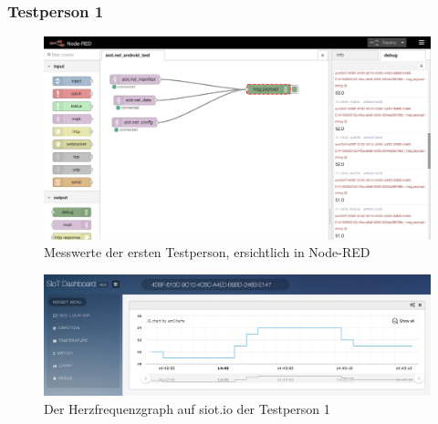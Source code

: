 \subsubsection{Testperson 1}
\begin{figure}[H]
  \centering
  \includegraphics[scale=0.375]{98_Bilder/11_Ergebnis/heartrateSPnodeRED}
  \caption[Node-RED Messwerte Person 1]{Messwerte der ersten Testperson, ersichtlich in Node-RED}
\end{figure}
\begin{figure}[H]
  \centering
  \includegraphics[scale=0.375]{98_Bilder/11_Ergebnis/heartrateSPsiotio}
  \caption[siot.io Dashboard Graph Person 1]{Der Herzfrequenzgraph auf siot.io der Testperson 1}
\end{figure}
